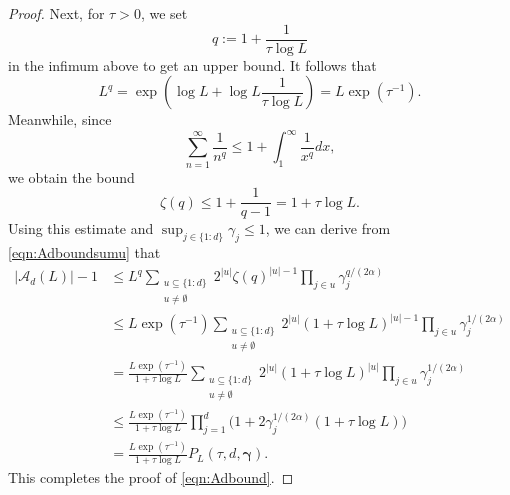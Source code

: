 \documentclass[10pt,a4paper]{amsart}
\newcommand{\Acal}{\mathcal{A}}
\newcommand{\bsgamma}{\boldsymbol{\gamma}}
\begin{document}
\begin{proof}
Next, for $\tau>0$, we set
\[ q:=1+\frac{1}{\tau \log L} \]
in the infimum above to get an upper bound. It follows that
\[ L^{q}=\exp\left(\log L + \log L \frac{1}{\tau \log L}\right)=L\exp(\tau^{-1}). \]
Meanwhile, since
\[ \sum_{n=1}^\infty \frac{1}{n^q}\leq 1+\int_1^\infty \frac{1}{x^q}dx, \]
we obtain the bound
\[ \zeta(q)\leq 1+ \frac{1}{q-1}=1+\tau \log L. \]
Using this estimate and $\sup_{j\in \{1{:}d\}}\gamma_j\leq 1$, we can derive from \eqref{eqn:Adboundsumu} that
\begin{align*}
    |\Acal_d(L)|-1 &\leq L^q \sum_{\substack{u\subseteq \{1{:}d\}\\u\neq \emptyset}} 2^{|u|} 
    \zeta(q)^{|u|-1}  \prod_{j\in u} \gamma_j^{q/(2\alpha)} \\
    & \leq L\exp(\tau^{-1}) \sum_{\substack{u\subseteq \{1{:}d\}\\u\neq \emptyset}} 2^{|u|}  (1+\tau \log L)^{|u|-1}\prod_{j\in u} \gamma_j^{1/(2\alpha)}  \\
    & =\frac{ L\exp(\tau^{-1})}{1+\tau\log L}  \sum_{\substack{u\subseteq \{1{:}d\}\\u\neq \emptyset}} 2^{|u|} (1+\tau \log L)^{|u|} \prod_{j\in u} \gamma_j^{1/(2\alpha)} \\
    & \leq  \frac{ L\exp(\tau^{-1})}{1+\tau\log L}  \prod_{j=1}^d \Big(1+2\gamma^{1/(2\alpha)}_j (1+\tau\log L)\Big)\\
    &= \frac{ L\exp(\tau^{-1})}{1+\tau\log L} P_{L}(\tau,d,\bsgamma).
\end{align*}
This completes the proof of \eqref{eqn:Adbound}.
\end{proof}
\end{document}
